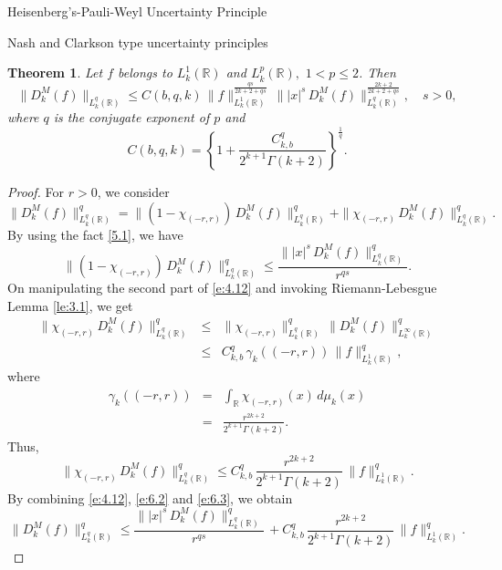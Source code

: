 \documentclass[12pt,a4paper,reqno]{amsproc}
\newtheorem{theorem}{Theorem}[section]
\theoremstyle{definition}
\theoremstyle{remark}
\numberwithin{equation}{section}
\begin{document}
\begin{subsection}{Heisenberg's-Pauli-Weyl Uncertainty Principle}
\begin{subsection}{Nash and Clarkson type uncertainty principles}
 \begin{theorem}\label{Th:3.4}
Let  $f$ belongs to $ L
 _k^1(\mathbb{R})$ and $L^p_k(\mathbb{R}), \,\, 1<p\le 2$. Then 
 \begin{equation*}
 \|D_k^M(f)\|_{L_k^{q}(\mathbb{R})} \le C(b,q,k) \, \|f\|_{L_k^1(\mathbb{R})}^{\frac{qs}{2k+2+qs}}\, \||x|^s\,D_k^M(f)\|_{L_k^{q}(\mathbb{R})}^{\frac{2k+2}{2k+2+qs}}, \quad s>0,
 \end{equation*}
 where $q$ is the conjugate exponent of $p$ and $$C(b,q,k) = \left \{ 1+\frac{C_{k,b}^q}{2^{k+1}\Gamma(k+2)}\right\}^{\frac{1}{q }}.$$
 \end{theorem}
 \begin{proof}
    For  $r>0$, we consider
 \begin{equation} \label{e:4.12}
 \|D_k^M(f)\|^q_{L_k^{q}(\mathbb{R})} =    \|\left(1-\chi_{(-r,r)}\right) \, D_k^M(f)\|^{q}_{L_k^{q}(\mathbb{R})}+ \|\chi_{(-r,r)}\, D_k^M(f)\|^{q}_{L_k^{q}(\mathbb{R})}.   
 \end{equation}
By using the fact \eqref{5.1}, we have
 \begin{equation}\label{e:6.2}
 \|\left(1-\chi_{(-r,r)}\right) \, D_k^M(f)\|^{q}_{L_k^{q}(\mathbb{R})}\le \frac{\||x|^s\, D_k^M(f)\|^{q}_{L_k^{q}(\mathbb{R})}}{r^{qs}}.   
 \end{equation}
 On manipulating the second part of \eqref{e:4.12} and invoking
 Riemann-Lebesgue Lemma \ref{le:3.1}, we get
\begin{eqnarray*}
    \|\chi_{(-r,r)}\, D_k^M(f)\|^{q}_{L_k^{q}(\mathbb{R})} &\le& \|\chi_{(-r,r)}\|^{q}_{L_k^{q}(\mathbb{R})}\, \|D_k^M(f)\|^q_{L^\infty_k(\mathbb{R})} \\
    &\le&C_{k,b}^{q}\,\gamma_k\left((-r,r)\right)\,  \|f\|^{q}_{L_k^1(\mathbb{R})},
\end{eqnarray*}
where
\begin{eqnarray} \label{5.9}
\nonumber\gamma_k\left((-r,r)\right) &= &\int_{\mathbb{R}}  \chi_{(-r,r)}(x)\, d\mu_k(x)\\ 
&=& \frac{r^{2k+2}}{2^{k+1}\Gamma(k+2)}.
\end{eqnarray}
Thus, 
\begin{equation}\label{e:6.3}
    \|\chi_{(-r,r)}\,D_k^M(f)\|_{L^{q}_k(\mathbb{R})}^{q} \le C_{k,b}^{q}\,  \frac{r^{2k+2}}{2^{k+1}\Gamma(k+2)}\,\|f\|^{q}_{L_k^1(\mathbb{R})}.
\end{equation}
By combining  \eqref{e:4.12}, \eqref{e:6.2} and \eqref{e:6.3}, we obtain
\begin{equation*}
 \|D_k^M(f)\|_{L_k^{q}(\mathbb{R})}^{q} \le \frac{\||x|^s\, D_k^M(f)\|^{q}_{L_k^{q}(\mathbb{R})}}{r^{qs}}  \,  +  C_{k,b}^{q}\,  \frac{r^{2k+2}}{2^{k+1}\Gamma(k+2)}\,\|f\|^{q}_{L_k^1(\mathbb{R})}. 

\end{equation*}
\end{proof}
\end{subsection}
\end{subsection}
\end{document}
